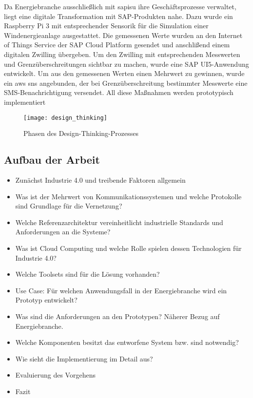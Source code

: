 Da Energiebranche ausschließlich mit \acf{sapisu} ihre Geschäftsprozesse verwaltet, liegt eine digitale Transformation
mit SAP-Produkten nahe. Dazu wurde ein Raspberry Pi 3 mit entsprechender Sensorik für die Simulation einer Windenergieanlage
ausgestattet. Die gemessenen Werte wurden an den Internet of Things Service der SAP Cloud Platform gesendet und anschlißend
einem digitalen Zwilling übergeben. Um den Zwilling mit entsprechenden Messwerten und Grenzüberschreitungen
sichtbar zu machen, wurde eine SAP UI5-Anwendung entwickelt. Um aus den gemessenen Werten einen Mehrwert zu gewinnen,
wurde ein \acf{aws} \acf{sns} angebunden, der bei Grenzüberschreitung bestimmter Messwerte eine
SMS-Benachrichtigung versendet. All diese Maßnahmen werden prototypisch implementiert

\begin{figure}[ht]
  \centering
  \texttt{[image: design\_thinking]}
  \caption[Phasen des Design-Thinking-Prozesses]{Phasen des Design-Thinking-Prozesses \citep[S. 69]{Elsner2018}}
  \label{}
\end{figure}

\subsection{Aufbau der Arbeit}



\begin{itemize}
  \item Zunächst Industrie 4.0 und treibende Faktoren allgemein
  \item Was ist der Mehrwert von Kommunikationssystemen und welche Protokolle sind Grundlage für die Vernetzung?
  \item Welche Referenzarchitektur vereinheitlicht industrielle Standards und Anforderungen an die Systeme?
  \item Was ist Cloud Computing und welche Rolle spielen dessen Technologien für Industrie 4.0?
  \item Welche Toolsets sind für die Lösung vorhanden?
  \item Use Case: Für welchen Anwendungsfall in der Energiebranche wird ein Prototyp entwickelt?
  \item Was sind die Anforderungen an den Prototypen? Näherer Bezug auf Energiebranche.
  \item Welche Komponenten besitzt das entworfene System bzw. sind notwendig?
  \item Wie sieht die Implementierung im Detail aus?
  \item Evaluierung des Vorgehens
  \item Fazit
\end{itemize}



\newpage
